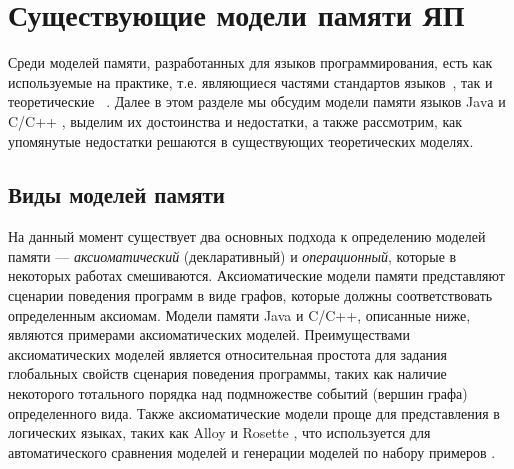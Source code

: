 





\section{Существующие модели памяти ЯП}
Среди моделей памяти, разработанных для языков программирования, есть как используемые на практике,
т.е. являющиеся частями стандартов языков~\cite{Gosling-al:BOOK96,JavaStandard,C:11,CPP:11}, так и теоретические~%
\cite{Crary-Sullivan:POPL15,Lamport:TC79,Boudol-al:EXPRESS12,Boudol-Petri:POPL09,PichonPharabod-Sewell:POPL16,Jeffrey-Riely:LICS16}.
Далее в этом разделе мы обсудим модели памяти языков Javа \cite{JavaStandard} и C/C++ \cite{C:11,CPP:11},
выделим их достоинства и недостатки, а также рассмотрим, как упомянутые недостатки решаются в существующих
теоретических моделях.

\subsection{Виды моделей памяти}
На данный момент существует два основных подхода к определению моделей памяти ---
\emph{аксиоматический} (декларативный) и \emph{операционный}, которые в некоторых работах смешиваются.
Аксиоматические модели памяти представляют сценарии поведения программ в виде графов, которые
должны соответствовать определенным аксиомам.
Модели памяти Java и C/C++, описанные ниже, являются примерами аксиоматических моделей.
Преимуществами аксиоматических моделей является относительная простота для задания глобальных
свойств сценария поведения программы,
таких как наличие некоторого тотального порядка над подмножестве событий (вершин графа)
определенного вида.
Также аксиоматические модели проще для представления в логических языках,
таких как Alloy \cite{Jackson:Book06} и Rosette
\cite{Torlak-Bodik:Onward13,Torlak-Bodik:PLDI14}, что используется
для автоматического сравнения моделей \cite{Wickerson-al:POPL17}
и генерации моделей по набору примеров \cite{Bornholt-Torlak:PLDI17}.

